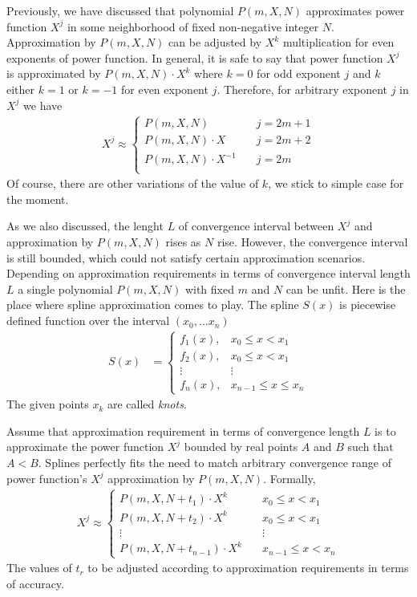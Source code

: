 ﻿Previously, we have discussed that polynomial $P(m,X,N)$ approximates power function $X^j$
in some neighborhood of fixed non-negative integer $N$.
Approximation by $P(m,X,N)$ can be adjusted by $X^k$ multiplication for even exponents of power function.
In general, it is safe to say that power function $X^j$ is approximated by $P(m,X,N) \cdot X^k$
where $k=0$ for odd exponent $j$ and $k$ either $k=1$ or $k=-1$ for even exponent $j$.
Therefore, for arbitrary exponent $j$ in $X^j$ we have
\begin{align*}
    X^j \approx
    \begin{cases}
        P(m,X,N) \quad         & j=2m+1 \\
        P(m,X,N) \cdot X \quad & j=2m+2 \\
        P(m,X,N) \cdot X^{-1} \quad & j=2m \\
    \end{cases}
\end{align*}
Of course, there are other variations of the value of $k$, we stick to simple case for the moment.

As we also discussed, the lenght $L$ of convergence interval between $X^j$ and approximation by $P(m,X,N)$
rises as $N$ rise.
However, the convergence interval is still bounded, which could not satisfy certain approximation scenarios.
Depending on approximation requirements in terms of convergence interval length $L$ a single polynomial $P(m,X,N)$
with fixed $m$ and $N$ can be unfit.
Here is the place where spline approximation comes to play.
The spline $S(x)$ is piecewise defined function over the interval $(x_0, \ldots x_n)$
\begin{align*}
    S(x) &=
    \begin{cases}
        f_1(x), & x_0 \leq x < x_1 \\
        f_2(x), & x_0 \leq x < x_1\\
        \vdots & \vdots \\
        f_n(x), & x_{n-1} \leq x \leq x_n
    \end{cases}
\end{align*}
The given points $x_k$ are called \textit{knots}.

Assume that approximation requirement in terms of convergence length $L$ is to approximate the power function $X^j$
bounded by real points $A$ and $B$ such that $A < B$.
Splines perfectly fits the need to match arbitrary convergence range of power function's $X^j$
approximation by $P(m,X,N)$.
Formally,
\begin{align*}
    X^j \approx
    \begin{cases}
        P(m,X,N+t_1) \cdot X^{k} \quad & x_0 \leq x < x_1 \\
        P(m,X,N+t_2) \cdot X^{k} \quad & x_0 \leq x < x_1 \\
        \vdots & \vdots \\
        P(m,X,N+t_{n-1}) \cdot X^{k} \quad & x_{n-1} \leq x < x_n
    \end{cases}
\end{align*}
The values of $t_r$ to be adjusted according to approximation requirements in terms of accuracy.

